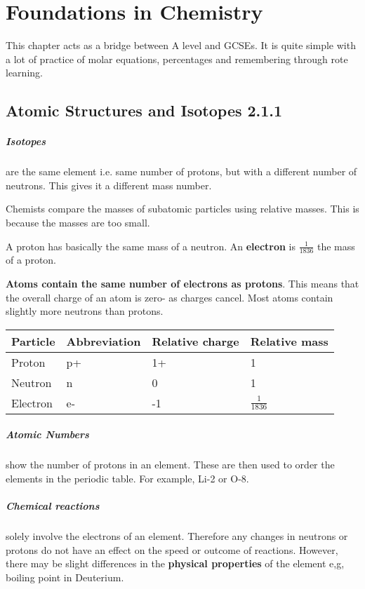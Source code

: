 \chapter{Foundations in Chemistry}
    This chapter acts as a bridge between A level and GCSEs. It is quite       simple with a lot of practice of molar equations, percentages and           remembering through rote learning.
    
\section{Atomic Structures and Isotopes 2.1.1}
      \paragraph{Isotopes}are the same element i.e. same number of protons, but with a different number of neutrons. This gives it a different mass number.
      
Chemists compare the masses of subatomic particles using relative masses. This is because the masses are too small.

A proton has basically the same mass of a neutron. An \textbf{electron} is \textbf{\( \frac{1}{1836} \)} the mass of a proton.

\textbf{Atoms contain the same number of electrons as protons}. This means that the overall charge of an atom is zero- as charges cancel. Most atoms contain slightly more neutrons than protons.



\begin{tabular}{ |p{3cm}||p{3cm}|p{3cm}|p{3cm}|  }
 \hline
 Particle    & Abbreviation &Relative charge&Relative mass\\
 \hline
 Proton   & p+    &1+&   1\\
 Neutron& n  & 0   &1\\
 Electron& e-  & -1&\(\frac{1}{1836} \)\\
 \hline
\end{tabular}

\paragraph{Atomic Numbers}show the number of protons in an element. These are then used to order the elements in the periodic table. For example, Li-2 or O-8.

\paragraph{Chemical reactions} solely involve the electrons of an element. Therefore any changes in neutrons or protons do not have an effect on the speed or outcome of reactions. However, there may be slight differences in the \textbf{physical properties} of the element e,g, boiling point in Deuterium.
